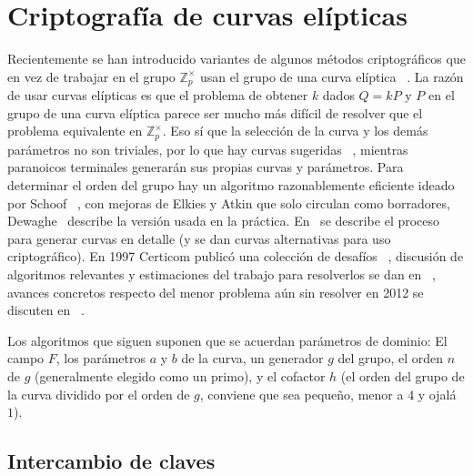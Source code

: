 \section{Criptografía de curvas elípticas}
\label{sec:EC-criptography}

  Recientemente se han introducido variantes
  de algunos métodos criptográficos
  que en vez de trabajar en el grupo \(\mathbb{Z}_p^\times\)
  usan el grupo de una curva elíptica~%
    \cite{hankerson04:_guide_ellip_curve_crypt}.
  La razón de usar curvas elípticas
  es que el problema de obtener \(k\) dados \(Q = k P\) y \(P\)
  en el grupo de una curva elíptica
  parece ser mucho más difícil de resolver
  que el problema equivalente en \(\mathbb{Z}_p^\times\).
  Eso sí que la selección de la curva
  y los demás parámetros no son triviales,
  por lo que hay curvas sugeridas~%
    \cite{secg09:_sec1,
	  secg10:_sec2,
	  NIST99:_recom_ellip_curves_feder_gover_use},
  mientras paranoicos terminales
  generarán sus propias curvas y parámetros.
  Para determinar el orden del grupo
  hay un algoritmo razonablemente eficiente
  ideado por Schoof~%
    \cite{schoof95:_count_point_ellip_curves_finit_field},
  con mejoras de Elkies y Atkin que solo circulan como borradores,
  Dewaghe~%
    \cite{dewaghe98:_remar_schoof_elkies_atkin_algor}
  describe la versión usada en la práctica.
  En~\cite{brainpool05:_stand_curves_curve_gener}
  se describe el proceso para generar curvas en detalle
  (y se dan curvas alternativas para uso criptográfico).
  En 1997 Certicom publicó una colección de desafíos~%
    \cite{certicom97:_ecc_chall},
  discusión de algoritmos relevantes
  y estimaciones del trabajo para resolverlos se dan en~%
    \cite{bailey09:_ecc2x},
  avances concretos
  respecto del menor problema
  aún sin resolver en 2012 se discuten en~%
    \cite{bailey09:_break_ecc2k-130}.

  Los algoritmos que siguen
  suponen que se acuerdan parámetros de dominio:
  El campo \(F\),
  los parámetros \(a\) y \(b\) de la curva,
  un generador \(g\) del grupo,
  el orden \(n\) de \(g\)
  (generalmente elegido como un primo),
  y el cofactor \(h\)
  (el orden del grupo de la curva dividido por el orden de \(g\),
   conviene que sea pequeño,
   menor a \(4\) y ojalá \(1\)).

\subsection{Intercambio de claves}
\label{sec:ECDH}

